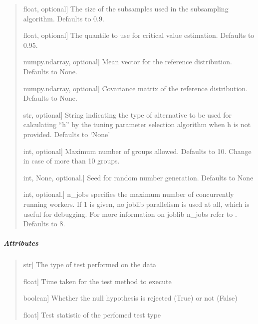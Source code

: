 \documentclass[letterpaper,10pt,english,openany,oneside]{sphinxmanual}
\begin{document}
{{{{\begin{fulllineitems}
\begin{quote}
\begin{description}
\sphinxlineitem{b}{[}float, optional{]}
\sphinxAtStartPar
The size of the subsamples used in the subsampling algorithm. Defaults to 0.9.

\sphinxlineitem{quantile}{[}float, optional{]}
\sphinxAtStartPar
The quantile to use for critical value estimation. Defaults to 0.95.

\sphinxlineitem{mu\_hat}{[}numpy.ndarray, optional{]}
\sphinxAtStartPar
Mean vector for the reference distribution. Defaults to None.

\sphinxlineitem{sigma\_hat}{[}numpy.ndarray, optional{]}
\sphinxAtStartPar
Covariance matrix of the reference distribution. Defaults to None.

\sphinxlineitem{alternative}{[}str, optional{]}
\sphinxAtStartPar
String indicating the type of alternative to be used for calculating “h”
by the tuning parameter selection algorithm when h is not provided.
Defaults to ‘None’

\sphinxlineitem{k\_threshold}{[}int, optional{]}
\sphinxAtStartPar
Maximum number of groups allowed. Defaults to 10. Change in case of more than 10 groups.

\sphinxlineitem{random\_state}{[}int, None, optional.{]}
\sphinxAtStartPar
Seed for random number generation. Defaults to None

\sphinxlineitem{n\_jobs}{[}int, optional.{]}
\sphinxAtStartPar
n\_jobs specifies the maximum number of concurrently
running workers. If 1 is given, no joblib parallelism
is used at all, which is useful for debugging. For more
information on joblib n\_jobs refer to \sphinxhyphen{}
.
Defaults to 8.

\end{description}
\end{quote}


\subparagraph{Attributes}
\label{\detokenize{api_reference/generated/QuadratiK.kernel_test.KernelTest:attributes}}\begin{quote}
\begin{description}
\sphinxlineitem{test\_type\_}{[}str{]}
\sphinxAtStartPar
The type of test performed on the data

\sphinxlineitem{execution\_time}{[}float{]}
\sphinxAtStartPar
Time taken for the test method to execute

\sphinxlineitem{h0\_rejected\_}{[}boolean{]}
\sphinxAtStartPar
Whether the null hypothesis is rejected (True) or not (False)

\sphinxlineitem{test\_statistic\_}{[}float{]}
\sphinxAtStartPar
Test statistic of the perfomed test type


\end{description}
\end{quote}
\end{fulllineitems}}}}}
\end{document}
